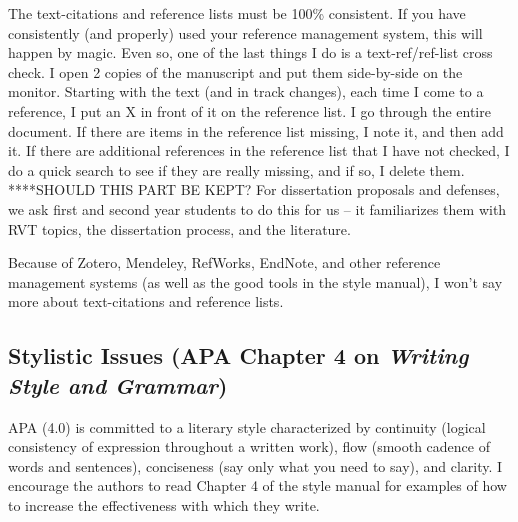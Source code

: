 \documentclass[
  11pt,
]{book}
\begin{document}
The text-citations and reference lists must be 100\% consistent. If you have consistently (and properly) used your reference management system, this will happen by magic. Even so, one of the last things I do is a text-ref/ref-list cross check. I open 2 copies of the manuscript and put them side-by-side on the monitor. Starting with the text (and in track changes), each time I come to a reference, I put an X in front of it on the reference list. I go through the entire document. If there are items in the reference list missing, I note it, and then add it. If there are additional references in the reference list that I have not checked, I do a quick search to see if they are really missing, and if so, I delete them. ****SHOULD THIS PART BE KEPT? For dissertation proposals and defenses, we ask first and second year students to do this for us -- it familiarizes them with RVT topics, the dissertation process, and the literature.

Because of Zotero, Mendeley, RefWorks, EndNote, and other reference management systems (as well as the good tools in the style manual), I won't say more about text-citations and reference lists.

\hypertarget{stylistic-issues-apa-chapter-4-on-writing-style-and-grammar}{%
\subsection{\texorpdfstring{Stylistic Issues (APA Chapter 4 on \emph{Writing Style and Grammar})}{Stylistic Issues (APA Chapter 4 on Writing Style and Grammar)}}\label{stylistic-issues-apa-chapter-4-on-writing-style-and-grammar}}

APA (4.0) is committed to a literary style characterized by continuity (logical consistency of expression throughout a written work), flow (smooth cadence of words and sentences), conciseness (say only what you need to say), and clarity. I encourage the authors to read Chapter 4 of the style manual for examples of how to increase the effectiveness with which they write.
\end{document}
